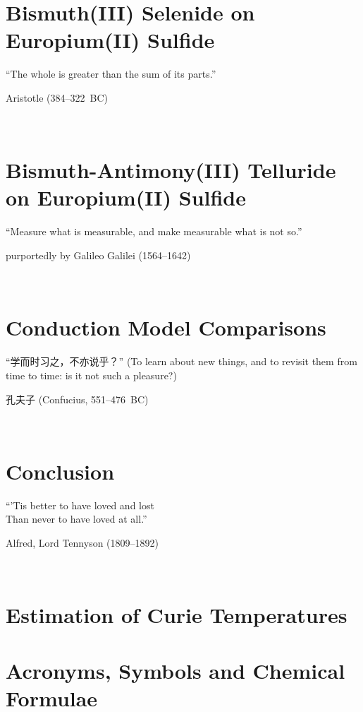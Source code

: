 ﻿\documentclass{report}
\begin{document}
\chapter{Bismuth(III) Selenide on Europium(II) Sulfide}\label{ch:bilayer2014}
\epigraph{``The whole is greater than the sum of its parts.''}{Aristotle (384--322~BC)}~\\
    

\chapter{Bismuth-Antimony(III) Telluride on Europium(II) Sulfide}\label{ch:bilayer2018}
\epigraph{``Measure what is measurable, and make measurable what is not so.''}{purportedly by Galileo Galilei (1564--1642)}~\\
    

\chapter{Conduction Model Comparisons}\label{ch:models}
    \begin{CJK*}{UTF8}{gkai}
    \epigraph{``学而时习之，不亦说乎？'' (To learn about new things, and to revisit them from time to time: is it not such a pleasure?)}{孔夫子 (Confucius, 551--476~BC)}~\\
    \end{CJK*}
    

\chapter{Conclusion}\label{ch:conclusion}
\epigraph{``'Tis better to have loved and lost\\Than never to have loved at all.''}{Alfred, Lord Tennyson (1809--1892)}~\\
    
\appendix
%
%
\chapter{Estimation of Curie Temperatures}\label{ap:curie}
    
\chapter{Acronyms, Symbols and Chemical Formulae}
    
    
\printbibliography[heading=bibintoc]
\end{document}
